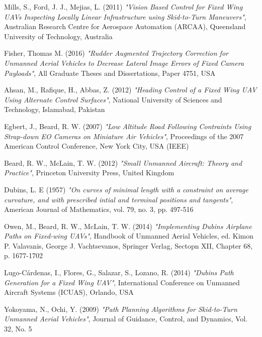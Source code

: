 \begin{thebibliography}{25}
	Mills, S., Ford, J. J., Mejias, L. (2011)
	\emph{"Vision Based Control for Fixed Wing UAVs Inspecting Locally Linear Infrastructure using Skid-to-Turn Maneuvers"}, 
	Australian Research Centre for Aerospace Automation (ARCAA), Queensland University of Technology, Australia
	
	Fisher, Thomas M. (2016)
	\emph{"Rudder Augmented Trajectory Correction for Unmanned Aerial Vehicles to Decrease Lateral Image Errors of Fixed Camera Payloads"},
	All Graduate Theses and Dissertations, Paper 4751, USA
	
	Ahsan, M., Rafique, H., Abbas, Z. (2012)
	\emph{"Heading Control of a Fixed Wing UAV Using Alternate Control Surfaces"},
	National University of Sciences and Technology, Islamabad, Pakistan
	
	Egbert, J., Beard, R. W. (2007)
	\emph{"Low Altitude Road Following Contraints Using Strap-down EO Cameras on Miniature Air Vehicles"},
	Proceedings of the 2007 American Control Conference, New York City, USA (IEEE)
	
	Beard, R. W., McLain, T. W. (2012)
	\emph{"Small Unmanned Aircraft: Theory and Practice"},
	Princeton University Press, United Kingdom
	
	
	Dubins, L. E (1957)
	\emph{"On curves of minimal length with a constraint on average curvature, and with prescribed intial and terminal positions and tangents"},
	American Journal of Mathematics, vol. 79, no. 3, pp. 497-516
	
	Owen, M., Beard, R. W., McLain, T. W. (2014)
	\emph{"Implementing Dubins Airplane Paths on Fixed-wing UAVs"},
	Handbook of Unmanned Aerial Vehicles, ed. Kimon P. Valavanis, George J. Vachtsevanos, Springer Verlag, Sectopn XII, Chapter 68, p. 1677-1702
	
	Lugo-Cárdenas, I., Flores, G., Salazar, S., Lozano, R. (2014)
	\emph{"Dubins Path Generation for a Fixed Wing UAV"},
	International Conference on Unmanned Aircraft Systems (ICUAS), Orlando, USA
	
	Yokoyama, N., Ochi, Y. (2009)
	\emph{"Path Planning Algorithms for Skid-to-Turn Unmanned Aerial Vehicles"},
	Journal of Guidance, Control, and Dynamics, Vol. 32, No. 5
	

\end{thebibliography}
